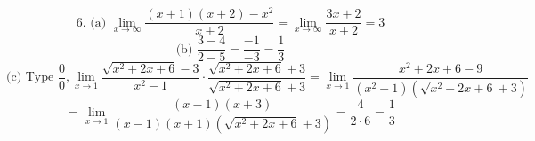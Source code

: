 \documentclass{article}
\begin{document}
\[
\text{6. (a) } \lim_{x \to \infty} \frac{(x+1)(x+2)-x^2}{x+2} = \lim_{x \to \infty} \frac{3x+2}{x+2} = 3
\]
\[
\text{(b) } \frac{3-4}{2-5} = \frac{-1}{-3} = \frac{1}{3}
\]
\[
\text{(c) Type } \frac{0}{0}, \lim_{x \to 1} \frac{\sqrt{x^2+2x+6}-3}{x^2-1} \cdot \frac{\sqrt{x^2+2x+6}+3}{\sqrt{x^2+2x+6}+3} = \lim_{x \to 1} \frac{x^2+2x+6-9}{(x^2-1)(\sqrt{x^2+2x+6}+3)}
\]
\[
= \lim_{x \to 1} \frac{(x-1)(x+3)}{(x-1)(x+1)(\sqrt{x^2+2x+6}+3)} = \frac{4}{2 \cdot 6} = \frac{1}{3}
\]
\end{document}
